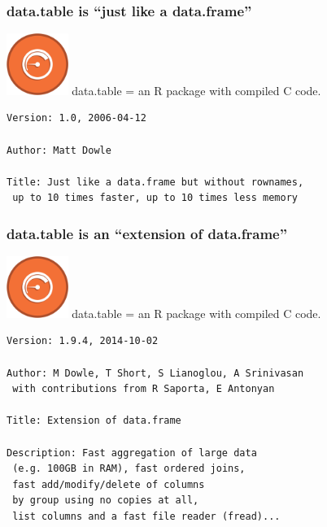 \documentclass{beamer}
\begin{document}
\begin{frame}[fragile]
  \frametitle{data.table is ``just like a data.frame''}

  \includegraphics[height=2cm]{datatable} 
  data.table = an R package with compiled C code.

\begin{verbatim}
Version: 1.0, 2006-04-12

Author: Matt Dowle

Title: Just like a data.frame but without rownames, 
 up to 10 times faster, up to 10 times less memory

\end{verbatim}



\end{frame}

\begin{frame}[fragile]
  \frametitle{data.table is an ``extension of data.frame''}

  \includegraphics[height=2cm]{datatable} 
  data.table = an R package with compiled C code.

\begin{verbatim}
Version: 1.9.4, 2014-10-02

Author: M Dowle, T Short, S Lianoglou, A Srinivasan 
 with contributions from R Saporta, E Antonyan

Title: Extension of data.frame

Description: Fast aggregation of large data
 (e.g. 100GB in RAM), fast ordered joins, 
 fast add/modify/delete of columns 
 by group using no copies at all, 
 list columns and a fast file reader (fread)...
\end{verbatim}

\end{frame}
\end{document}
